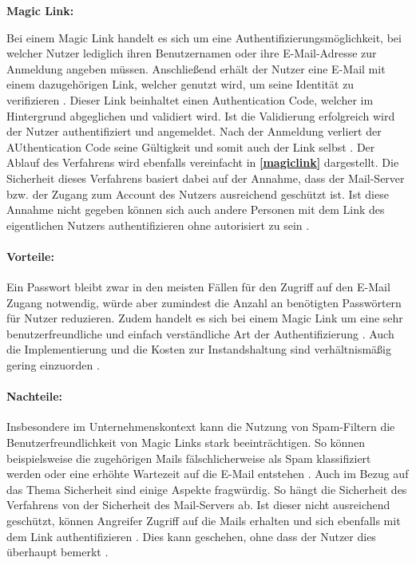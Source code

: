 \textbf{Magic Link:}

Bei einem Magic Link handelt es sich um eine
Authentifizierungsmöglichkeit, bei welcher Nutzer
lediglich ihren Benutzernamen oder ihre E-Mail-Adresse
zur Anmeldung angeben müssen. Anschließend erhält der Nutzer eine E-Mail mit einem dazugehörigen Link, welcher genutzt wird, um seine Identität zu verifizieren \cite{chowhan2019password} \cite{parmar2022comprehensive}.
Dieser Link beinhaltet einen Authentication Code, welcher im Hintergrund abgeglichen und validiert wird. Ist die Validierung erfolgreich wird der Nutzer authentifiziert und angemeldet. Nach der Anmeldung verliert der AUthentication Code seine Gültigkeit und somit auch der Link selbst \cite{chowhan2019password}. Der Ablauf des Verfahrens wird ebenfalls vereinfacht in \textbf{\ref{magiclink}} dargestellt.
Die Sicherheit dieses Verfahrens basiert dabei auf der Annahme, dass der Mail-Server bzw. der Zugang zum Account des Nutzers ausreichend geschützt ist. Ist diese Annahme nicht gegeben können sich auch andere Personen mit dem Link des eigentlichen Nutzers authentifizieren ohne autorisiert zu sein \cite{chowhan2019password}. 

\paragraph*{Vorteile:} Ein Passwort bleibt zwar in den meisten Fällen für den Zugriff auf den E-Mail Zugang notwendig, würde aber zumindest die Anzahl an benötigten Passwörtern für Nutzer reduzieren. Zudem handelt es sich bei einem Magic Link um eine sehr benutzerfreundliche und einfach verständliche Art der Authentifizierung \cite{parmar2022comprehensive}. Auch die Implementierung und die Kosten zur Instandshaltung sind verhältnismäßig gering einzuorden \cite{parmar2022comprehensive}.

\paragraph*{Nachteile:} Insbesondere im Unternehmenskontext kann die Nutzung von Spam-Filtern die Benutzerfreundlichkeit von Magic Links stark beeinträchtigen. So können beispielsweise die zugehörigen Mails fälschlicherweise als Spam klassifiziert werden oder eine erhöhte Wartezeit auf die E-Mail entstehen \cite{parmar2022comprehensive}. Auch im Bezug auf das Thema Sicherheit sind einige Aspekte fragwürdig. So hängt die Sicherheit des Verfahrens von der Sicherheit des Mail-Servers ab. Ist dieser nicht ausreichend geschützt, können Angreifer Zugriff auf die Mails erhalten und sich ebenfalls mit dem Link authentifizieren \cite{chowhan2019password}. Dies kann geschehen, ohne dass der Nutzer dies überhaupt bemerkt \cite{chowhan2019password}.

